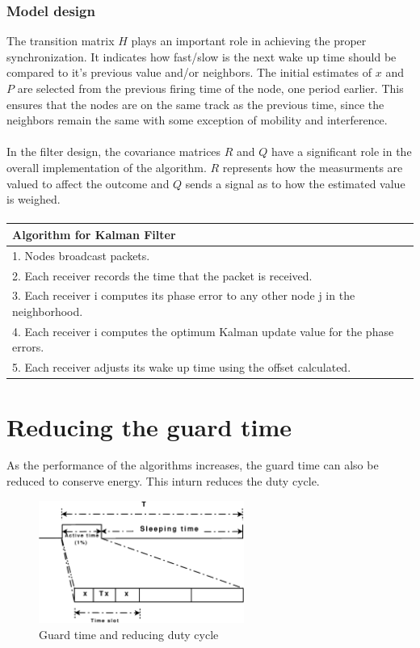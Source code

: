 \documentclass[a4paper,10pt]{report}
\begin{document}
\subsubsection{Model design}
The transition matrix $H$ plays an important role in achieving the proper synchronization. It indicates how fast/slow is the next wake up time should be compared to it's previous value and/or neighbors. The initial estimates of $x$ and $P$ are selected from the previous firing time of the node, one period earlier. This ensures that the nodes are on the same track as the previous time, since the neighbors remain the same with some exception of mobility and interference. \paragraph*{}
In the filter design, the covariance matrices $R$ and $Q$ have a significant
role in the overall implementation of the algorithm. $R$ represents how
 the measurments are valued to affect the outcome and $Q$
sends a signal as to how the estimated value is weighed.
\paragraph*{}
\begin{tabular}{  l }Algorithm for Kalman Filter \\ \hline \hline
1. Nodes broadcast packets. \\  2. Each receiver records the time that the packet is received. \\
3. Each receiver i computes its phase error to any other node j in the neighborhood. \\
4. Each receiver i computes the optimum Kalman update value for the phase errors. \\
5. Each receiver adjusts its wake up time using the offset calculated.\\
\hline \hline
\end{tabular}
\section{\textbf{Reducing the guard time}}
As the performance of the algorithms increases, the guard time can also be reduced to conserve energy. This inturn
reduces the duty cycle.
\begin{figure}
\centering
\includegraphics[width=0.6\textwidth]{guardtimesaving}
\caption{Guard time and reducing duty cycle} \label{guardtimesaving}
\end{figure}
\end{document}
